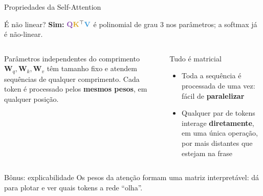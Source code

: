 \documentclass[aspectratio=169,xcolor=dvipsnames]{beamer}
\newcommand{\Qc}{\textcolor{qcolor}{\mathbf{Q}}}
\newcommand{\Kc}{\textcolor{kcolor}{\mathbf{K}}}
\newcommand{\Vc}{\textcolor{vcolor}{\mathbf{V}}}
\begin{document}
\begin{frame}[shrink=5]{Propriedades da Self-Attention}

\begin{block}{É não linear?}
\textbf{Sim:} $\Qc \Kc^{\top} \Vc$ é polinomial de grau 3 nos parâmetros; a softmax já é não-linear.
\end{block}

\begin{columns}[T]
\begin{block}{Parâmetros independentes do comprimento}
$\mathbf{W}_q, \mathbf{W}_k, \mathbf{W}_v$ têm tamanho fixo e atendem sequências de qualquer comprimento. Cada token é processado pelos \textbf{mesmos pesos}, em qualquer posição.
\end{block}

\begin{block}{Tudo é matricial}
\begin{itemize}
    \item Toda a sequência é processada de uma vez: fácil de \textbf{paralelizar}
    \item Qualquer par de tokens interage \textbf{diretamente}, em uma única operação, por mais distantes que estejam na frase
\end{itemize}
\end{block}
\end{columns}

\begin{exampleblock}{Bônus: explicabilidade}
Os pesos da atenção formam uma matriz interpretável: dá para plotar e ver quais tokens a rede ``olha''.
\end{exampleblock}

\end{frame}

\end{document}
